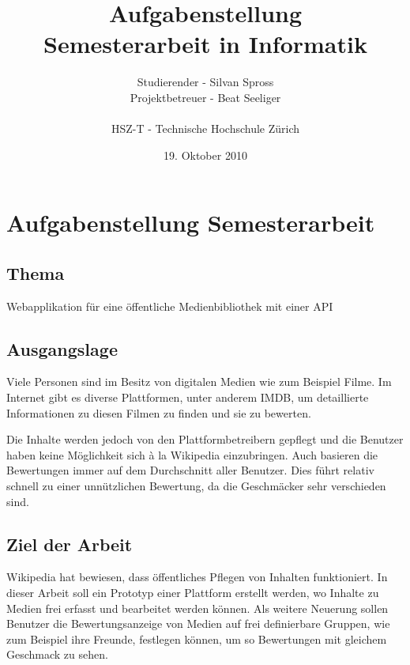 \documentclass[]{scrreprt}
\title{Aufgabenstellung\\
    Semesterarbeit in Informatik}
\author{Studierender - Silvan Spross\\
    Projektbetreuer - Beat Seeliger\\
    \\
    HSZ-T - Technische Hochschule Zürich}
\date{19. Oktober 2010}
\begin{document}
    \ifpdf
    \else
    \fi

    \maketitle



    \chapter{Aufgabenstellung Semesterarbeit}

    \section{Thema}
    Webapplikation für eine öffentliche Medienbibliothek mit einer 
    API

    \section{Ausgangslage}
    Viele Personen sind im Besitz von digitalen Medien wie zum Beispiel Filme.
    Im Internet gibt es diverse Plattformen, unter anderem IMDB, um 
    detaillierte Informationen zu diesen Filmen zu finden und sie zu bewerten. 
    
    Die Inhalte werden jedoch von den Plattformbetreibern gepflegt und die 
    Benutzer haben keine Möglichkeit sich à la Wikipedia einzubringen. Auch 
    basieren die Bewertungen immer auf dem Durchschnitt aller Benutzer. Dies
    führt relativ schnell zu einer unnützlichen Bewertung, da die Geschmäcker
    sehr verschieden sind.

    \section{Ziel der Arbeit}
    Wikipedia hat bewiesen, dass öffentliches Pflegen von Inhalten 
    funktioniert. In dieser Arbeit soll ein Prototyp einer Plattform erstellt
    werden, wo Inhalte zu Medien frei erfasst und bearbeitet werden können.
    Als weitere Neuerung sollen Benutzer die Bewertungsanzeige von Medien auf
    frei definierbare Gruppen, wie zum Beispiel ihre Freunde, festlegen 
    können, um so Bewertungen mit gleichem Geschmack zu sehen.
    
\end{document}
